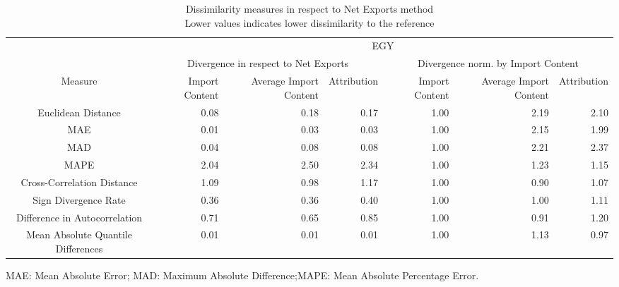 \begin{table}[t]
\caption*{
{\large Dissimilarity measures in respect to Net Exports method} \\ 
{\small Lower values indicates lower dissimilarity to the reference}
} 
\fontsize{15.0pt}{18.0pt}\selectfont
\begin{tabular*}{\linewidth}{@{\extracolsep{\fill}}crrrrrr}
\toprule
 & \multicolumn{6}{c}{EGY} \\ 
\cmidrule(lr){2-7}
 & \multicolumn{3}{c}{Divergence in respect to Net Exports} & \multicolumn{3}{c}{Divergence norm. by Import Content} \\ 
\cmidrule(lr){2-4} \cmidrule(lr){5-7}
Measure & Import Content & Average Import Content & Attribution & Import Content & Average Import Content & Attribution \\ 
\midrule\addlinespace[2.5pt]
Euclidean Distance & 0.08 & 0.18 & 0.17 & 1.00 & 2.19 & 2.10 \\ 
MAE & 0.01 & 0.03 & 0.03 & 1.00 & 2.15 & 1.99 \\ 
MAD & 0.04 & 0.08 & 0.08 & 1.00 & 2.21 & 2.37 \\ 
MAPE & 2.04 & 2.50 & 2.34 & 1.00 & 1.23 & 1.15 \\ 
Cross-Correlation Distance & 1.09 & 0.98 & 1.17 & 1.00 & 0.90 & 1.07 \\ 
Sign Divergence Rate & 0.36 & 0.36 & 0.40 & 1.00 & 1.00 & 1.11 \\ 
Difference in Autocorrelation & 0.71 & 0.65 & 0.85 & 1.00 & 0.91 & 1.20 \\ 
Mean Absolute Quantile Differences & 0.01 & 0.01 & 0.01 & 1.00 & 1.13 & 0.97 \\ 
\bottomrule
\end{tabular*}
\begin{minipage}{\linewidth}
MAE: Mean Absolute Error; MAD: Maximum Absolute Difference;MAPE: Mean Absolute Percentage Error.\\
\end{minipage}
\end{table}

